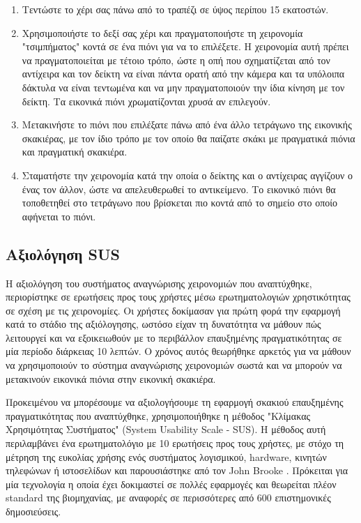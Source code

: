 \begin{enumerate}
 
\item Τεντώστε το χέρι σας πάνω από το τραπέζι σε ύψος περίπου 15 εκατοστών.
\item Χρησιμοποιήστε το δεξί σας χέρι και πραγματοποιήστε τη χειρονομία "τσιμπήματος" κοντά σε ένα πιόνι για να το επιλέξετε. Η χειρονομία αυτή πρέπει να πραγματοποιείται με τέτοιο τρόπο, ώστε η οπή που σχηματίζεται από τον αντίχειρα και τον δείκτη να είναι πάντα ορατή από την κάμερα και τα υπόλοιπα δάκτυλα να είναι τεντωμένα και να μην πραγματοποιούν την ίδια κίνηση με τον δείκτη. Τα εικονικά πιόνι χρωματίζονται χρυσά αν επιλεγούν.
\item Μετακινήστε το πιόνι που επιλέξατε πάνω από ένα άλλο τετράγωνο της εικονικής σκακιέρας, με τον ίδιο τρόπο με τον οποίο θα παίζατε σκάκι με πραγματικά πιόνια και πραγματική σκακιέρα. 
\item Σταματήστε την χειρονομία κατά την οποία ο δείκτης και ο αντίχειρας αγγίζουν ο ένας τον άλλον, ώστε να απελευθερωθεί το αντικείμενο. Το εικονικό πιόνι θα τοποθετηθεί στο τετράγωνο που βρίσκεται πιο κοντά από το σημείο στο οποίο αφήνεται το πιόνι.
\end{enumerate}

\subsection{Αξιολόγηση SUS}


Η αξιολόγηση του συστήματος αναγνώρισης χειρονομιών που αναπτύχθηκε, περιορίστηκε σε ερωτήσεις προς τους χρήστες μέσω ερωτηματολογιών χρηστικότητας σε σχέση με τις χειρονομίες. Οι χρήστες δοκίμασαν για πρώτη φορά την εφαρμογή κατά το στάδιο της αξιόλογησης, ωστόσο είχαν τη δυνατότητα να μάθουν πώς λειτουργεί και να εξοικειωθούν με το περιβάλλον επαυξημένης πραγματικότητας σε μία περίοδο διάρκειας 10 λεπτών. Ο χρόνος αυτός θεωρήθηκε αρκετός για να μάθουν να χρησιμοποιούν το σύστημα αναγνώρισης χειρονομιών σωστά και να μπορούν να μετακινούν εικονικά πιόνια στην εικονική σκακιέρα. 


Προκειμένου να μπορέσουμε να αξιολογήσουμε τη εφαρμογή σκακιού επαυξημένης πραγματικότητας που αναπτύχθηκε, χρησιμοποιήθηκε η μέθοδος "Κλίμακας Χρησιμότητας Συστήματος" (System Usability Scale - SUS). Η μέθοδος αυτή περιλαμβάνει ένα ερωτηματολόγιο με 10 ερωτήσεις προς τους χρήστες, με στόχο τη μέτρηση της ευκολίας χρήσης ενός συστήματος λογισμικού, hardware, κινητών τηλεφώνων ή ιστοσελίδων και παρουσιάστηκε από τον John Brooke \cite{Brooke1996}. Πρόκειται για μία τεχνολογία η οποία έχει δοκιμαστεί σε πολλές εφαρμογές και θεωρείται πλέον standard της βιομηχανίας, με αναφορές σε περισσότερες από 600 επιστημονικές δημοσιεύσεις. 


